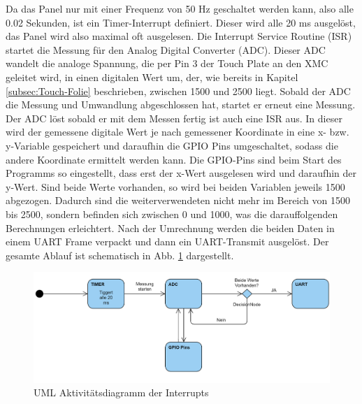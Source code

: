\documentclass[12pt,a4paper,bibliography=totoc,listof=totoc]{scrartcl}
\begin{document}
Da das Panel nur mit einer Frequenz von 50 Hz geschaltet werden kann, also alle 0.02 Sekunden, ist ein Timer-Interrupt definiert. Dieser wird alle 20 ms ausgelöst, das Panel wird also maximal oft ausgelesen. Die Interrupt Service Routine (ISR) startet die Messung für den Analog Digital Converter (ADC). Dieser ADC wandelt die analoge Spannung, die per Pin 3 der Touch Plate an den XMC geleitet wird, in einen digitalen Wert um, der, wie bereits in Kapitel \ref{subsec:Touch-Folie} beschrieben, zwischen 1500 und 2500 liegt. Sobald der ADC die Messung und Umwandlung abgeschlossen hat, startet er erneut eine Messung. 
Der ADC löst sobald er mit dem Messen fertig ist auch eine ISR aus. In dieser wird der gemessene digitale Wert je nach gemessener Koordinate in eine x- bzw. y-Variable gespeichert und daraufhin die GPIO Pins umgeschaltet, sodass die andere Koordinate ermittelt werden kann.
Die GPIO-Pins sind beim Start des Programms so eingestellt, dass erst der x-Wert ausgelesen wird und daraufhin der y-Wert. Sind beide Werte vorhanden, so wird bei beiden Variablen jeweils 1500 abgezogen. Dadurch sind die weiterverwendeten nicht mehr im Bereich von 1500 bis 2500, sondern befinden sich zwischen 0 und 1000, was die darauffolgenden Berechnungen erleichtert. Nach der Umrechnung werden die beiden Daten in einem UART Frame verpackt und dann ein UART-Transmit ausgelöst.
Der gesamte Ablauf ist schematisch in Abb. \ref{fig:TouchUML} dargestellt.

\begin{figure}[htbp]
	\centering
	\includegraphics[scale = 0.65]{pics/TouchUML.png}
	\caption{UML Aktivitätsdiagramm der Interrupts}
	\label{fig:TouchUML}
\end{figure}
\end{document}
